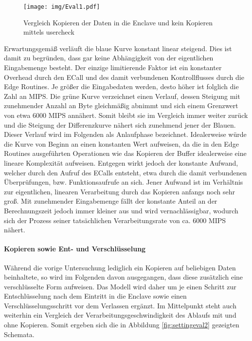 \begin{figure}[h]
	\texttt{[image: img/Eval1.pdf]}
	\centering
	\caption{Vergleich Kopieren der Daten in die Enclave und kein Kopieren mittels user\textunderscore check}
	\label{fig:eval1}
\end{figure}

Erwartungsgemäß verläuft die blaue Kurve konstant linear steigend. Dies ist damit zu begründen, dass  gar keine Abhängigkeit von der eigentlichen Eingabemenge besteht. Der einzige limitierende Faktor ist ein konstanter Overhead durch den \ac{ECall} und des damit verbundenen Kontrollflusses durch die Edge Routines. Je größer die Eingabedaten werden, desto höher ist folglich die Zahl an \ac{MIPS}. Die grüne Kurve verzeichnet einen Verlauf, dessen Steigung mit zunehmender Anzahl an Byte gleichmäßig abnimmt und sich einem Grenzwert von etwa 6000 \ac{MIPS} annähert. Somit bleibt sie im Vergleich immer weiter zurück und die Steigung der Differenzkurve nähert sich zunehmend jener der Blauen. Dieser Verlauf wird im Folgenden als Anlaufphase bezeichnet. Idealerweise würde die Kurve von Beginn an einen konstanten Wert aufweisen, da die in den Edge Routines ausgeführten Operationen wie das Kopieren der Buffer idealerweise eine lineare Komplexität aufweisen. Entgegen wirkt jedoch der konstante Aufwand, welcher durch den Aufruf des \acp{ECall} entsteht, etwa durch die damit verbundenen Überprüfungen, bzw. Funktionsaufrufe an sich. Jener Aufwand ist im Verhältnis zur eigentlichen, linearen Verarbeitung durch das Kopieren anfangs noch sehr groß. Mit zunehmender Eingabemenge fällt der konstante Anteil an der Berechnungszeit jedoch immer kleiner aus und wird vernachlässigbar, wodurch sich der Prozess seiner tatsächlichen Verarbeitungsrate von ca. 6000 \ac{MIPS} nähert.

\paragraph{Kopieren sowie Ent- und Verschlüsselung}

Während die vorige Untersuchung lediglich ein Kopieren auf beliebigen Daten beinhaltete, so wird im Folgenden davon ausgegangen, dass diese zusätzlich eine verschlüsselte Form aufweisen. Das Modell wird daher um je einen Schritt zur Entschlüsselung nach dem Eintritt in die Enclave sowie einen Verschlüsselungsschritt vor dem Verlassen ergänzt. Im Mittelpunkt steht auch weiterhin ein Vergleich der Verarbeitungsgeschwindigkeit des Ablaufs mit und ohne Kopieren. Somit ergeben sich die in Abbildung \ref{fig:settingeval2} gezeigten Schemata.

